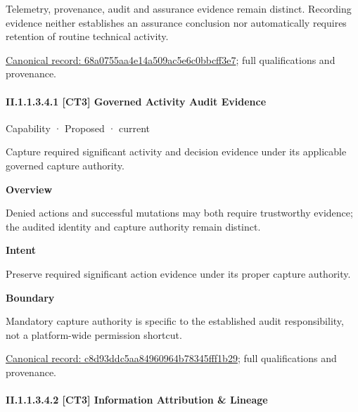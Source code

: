 Telemetry, provenance, audit and assurance evidence remain distinct. Recording evidence neither establishes an assurance conclusion nor automatically requires retention of routine technical activity.


{\footnotesize \href{../../../../continuum/strategy/capability/68a0755aa4e14a509ac5e6c0bbcff3e7.md}{Canonical record: 68a0755aa4e14a509ac5e6c0bbcff3e7}; full qualifications and provenance.}\par
\paragraph*{II.1.1.3.4.1 [CT3] Governed Activity Audit Evidence}
\label{navigation:II.1.1.3.4.1}

\label{element:c8d93ddc5aa84960964b78345fff1b29}
{\small Capability · Proposed · current}\par

Capture required significant activity and decision evidence under its applicable governed capture authority.



\textbf{Overview}



Denied actions and successful mutations may both require trustworthy evidence; the audited identity and capture authority remain distinct.



\textbf{Intent}



Preserve required significant action evidence under its proper capture authority.



\textbf{Boundary}



Mandatory capture authority is specific to the established audit responsibility, not a platform-wide permission shortcut.


{\footnotesize \href{../../../../continuum/strategy/capability/c8d93ddc5aa84960964b78345fff1b29.md}{Canonical record: c8d93ddc5aa84960964b78345fff1b29}; full qualifications and provenance.}\par
\paragraph*{II.1.1.3.4.2 [CT3] Information Attribution \& Lineage}
\label{navigation:II.1.1.3.4.2}

